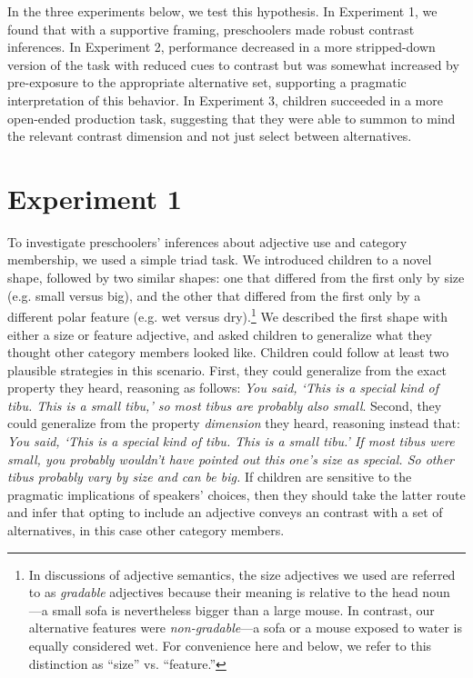 \documentclass[man]{apa2}
\begin{document}
In the three experiments below, we test this hypothesis. In Experiment 1, we found that with a supportive framing, preschoolers made robust contrast inferences.  In Experiment 2, performance decreased in a more stripped-down version of the task with reduced cues to contrast but was somewhat increased by pre-exposure to the appropriate alternative set, supporting a pragmatic interpretation of this behavior. In Experiment 3, children succeeded in a more open-ended production task, suggesting that they were able to summon to mind the relevant contrast dimension and not just select between alternatives.

\section{Experiment 1}

To investigate preschoolers' inferences about adjective use and category membership, we used a simple triad task.  We introduced children to a novel shape, followed by two similar shapes: one that differed from the first only by size (e.g. small versus big), and the other that differed from the first only by a different polar feature (e.g. wet versus dry).\footnote{In discussions of adjective semantics, the size adjectives we used are referred to as \emph{gradable} adjectives because their meaning is relative to the head noun \cite{kennedy2012}---a small sofa is nevertheless bigger than a large mouse. In contrast, our alternative features were \emph{non-gradable}---a sofa or a mouse exposed to water is equally considered wet. For convenience here and below, we refer to this distinction as ``size'' vs. ``feature.''} We described the first shape with either a size or feature adjective, and asked children to generalize what they thought other category members looked like. Children could follow at least two plausible strategies in this scenario. First, they could generalize from the exact property they heard, reasoning as follows: \emph{You said, `This is a special kind of tibu. This is a small tibu,' so most tibus are probably also small}. Second, they could generalize from the property \emph{dimension} they heard, reasoning instead that: \emph{You said, `This is a special kind of tibu. This is a small tibu.' If most tibus were small, you probably wouldn't have pointed out this one's size as special. So other tibus probably vary by size and can be big.} If children are sensitive to the pragmatic implications of speakers' choices, then they should take the latter route and infer that opting to include an adjective conveys an contrast with a set of alternatives, in this case other category members. 
\end{document}
